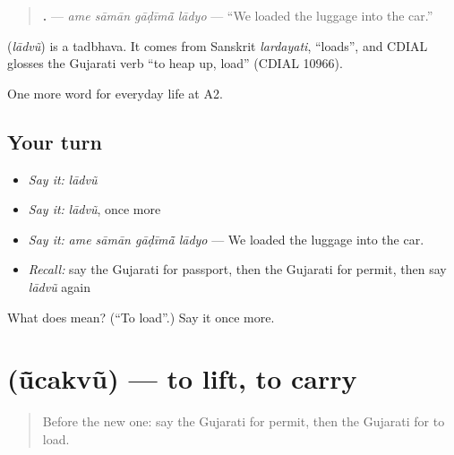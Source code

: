 \begin{quote}
\textbf{   .} — \emph{ame sāmān gāḍīmā̃ lādyo} — \textquotedblleft{}We loaded the luggage into the car.\textquotedblright{}
\end{quote}

\begin{cousinweb}
\textbf{} (\emph{lādvũ}) is a tadbhava. It comes from Sanskrit \emph{lardayati}, \textquotedblleft{}loads\textquotedblright{}, and CDIAL glosses the Gujarati verb \textquotedblleft{}to heap up, load\textquotedblright{} (CDIAL 10966).
\end{cousinweb}

\begin{grammarlens}[title={What you've built}]
One more word for everyday life at A2.
\end{grammarlens}

\subsection*{Your turn}
\begin{itemize}
\raggedright
  \item \emph{Say it:} \emph{lādvũ}
  \item \emph{Say it:} \emph{lādvũ}, once more
  \item \emph{Say it:} \emph{ame sāmān gāḍīmā̃ lādyo} — We loaded the luggage into the car.
  \item \emph{Recall:} say the Gujarati for passport, then the Gujarati for permit, then say \emph{lādvũ} again
\end{itemize}

\begin{tcolorbox}[breakable,colback=teal!4,colframe=teal!35!black,title={Before you move on}]
What does  mean? (\textquotedblleft{}To load\textquotedblright{}.) Say it once more.
\end{tcolorbox}
\section[\texorpdfstring{\gu{ઊંચકવું} (ū̃cakvũ)}{ઊંચકવું (ū̃cakvũ)}]{ (ū̃cakvũ) — to lift, to carry}

\label{lesson:GU-C210-uncakvu}



\begin{quote}
Before the new one: say the Gujarati for permit, then the Gujarati for to load.
\end{quote}

